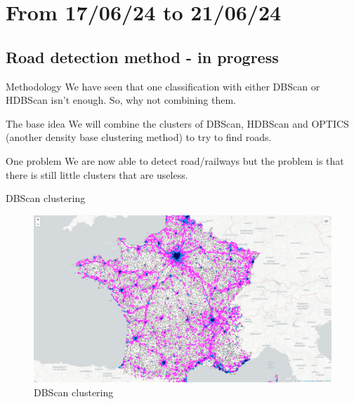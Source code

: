 \smallframetitle

\section{From 17/06/24 to 21/06/24}
\insertsectionframe

\subsection{Road detection method - in progress}
\insertsubsectionframe

\begin{frame}{Methodology}
    We have seen that one classification with either DBScan or HDBScan isn't enough. So, why not combining them.
    \begin{block}{The base idea}
        We will combine the clusters of DBScan, HDBScan and OPTICS (another density base clustering method) to try to find roads.
    \end{block}

    \begin{block}{One problem}
        We are now able to detect road/railways but the problem is that there is still little clusters that are useless.
    \end{block}
\end{frame}

\begin{frame}{DBScan clustering}
    \begin{figure}
        \includegraphics[height=0.6\paperheight]{images/cartes/road_detection/dbs.png}
        \caption{DBScan clustering}
    \end{figure}
\end{frame}

